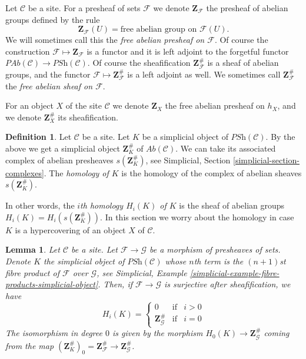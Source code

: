 \documentclass{stacks-project}
\theoremstyle{plain}
\newtheorem{lemma}[subsection]{Lemma}
\theoremstyle{definition}
\newtheorem{definition}[subsection]{Definition}
\theoremstyle{remark}
\numberwithin{equation}{subsection}
\begin{document}
\noindent
Let $\mathcal{C}$ be a site.
For a presheaf of sets $\mathcal{F}$ we denote $\mathbf{Z}_\mathcal{F}$
the presheaf of abelian groups defined by the rule
$$
\mathbf{Z}_\mathcal{F}(U) = \text{free abelian group on }\mathcal{F}(U).
$$
We will sometimes call this the {\it free abelian presheaf on $\mathcal{F}$}.
Of course the construction $\mathcal{F} \mapsto \mathbf{Z}_\mathcal{F}$
is a functor and it is left adjoint to the forgetful functor
$\textit{PAb}(\mathcal{C}) \to \textit{PSh}(\mathcal{C})$.
Of course the sheafification $\mathbf{Z}_\mathcal{F}^\#$ is
a sheaf of abelian groups, and the functor
$\mathcal{F} \mapsto \mathbf{Z}_\mathcal{F}^\#$ is a
left adjoint as well. We sometimes call $\mathbf{Z}_\mathcal{F}^\#$
the {\it free abelian sheaf on $\mathcal{F}$}.

\medskip\noindent
For an object $X$ of the site $\mathcal{C}$ we denote
$\mathbf{Z}_X$ the free abelian presheaf on $h_X$, and
we denote $\mathbf{Z}_X^\#$ its sheafification.

\begin{definition}
\label{definition-homology}
Let $\mathcal{C}$ be a site.
Let $K$ be a simplicial object of $\textit{PSh}(\mathcal{C})$.
By the above we get a simplicial object $\mathbf{Z}_K^\#$ of
$\textit{Ab}(\mathcal{C})$. We can take its associated
complex of abelian presheaves $s(\mathbf{Z}_K^\#)$, see
Simplicial, Section \ref{simplicial-section-complexes}.
The {\it homology of $K$} is the homology of the
complex of abelian sheaves $s(\mathbf{Z}_K^\#)$.
\end{definition}

\noindent
In other words, the {\it $i$th homology $H_i(K)$ of $K$}
is the sheaf of abelian groups $H_i(K) = H_i(s(\mathbf{Z}_K^\#))$.
In this section we worry about the homology in case $K$
is a hypercovering of an object $X$ of $\mathcal{C}$.

\begin{lemma}
\label{lemma-compare-cosk0}
Let $\mathcal{C}$ be a site.
Let $\mathcal{F} \to \mathcal{G}$ be a morphism
of presheaves of sets. Denote $K$ the simplicial
object of $\textit{PSh}(\mathcal{C})$ whose $n$th
term is the $(n + 1)$st fibre product of $\mathcal{F}$
over $\mathcal{G}$, see
Simplicial, Example \ref{simplicial-example-fibre-products-simplicial-object}.
Then, if $\mathcal{F} \to \mathcal{G}$ is surjective after
sheafification, we have
$$
H_i(K) =
\left\{
\begin{matrix}
0 & \text{if} & i > 0\\
\mathbf{Z}_\mathcal{G}^\# & \text{if} & i = 0
\end{matrix}
\right.
$$
The isomorphism in degree $0$ is given by the
morphism $H_0(K) \to \mathbf{Z}_\mathcal{G}^\#$
coming from the map $(\mathbf{Z}_K^\#)_0 =
\mathbf{Z}_\mathcal{F}^\# \to \mathbf{Z}_\mathcal{G}^\#$.
\end{lemma}
\end{document}
